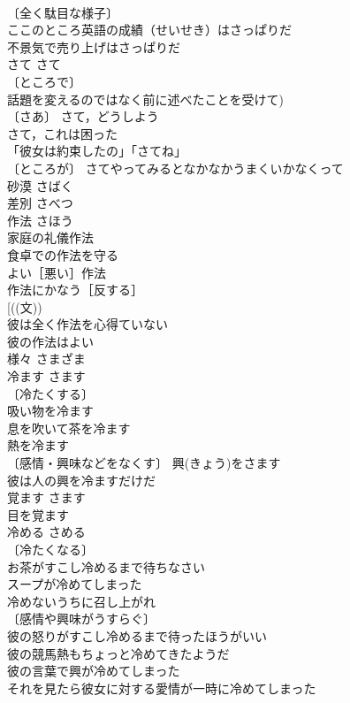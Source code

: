 \documentclass[8pt]{extreport}
\begin{document}
\begin{CJK}{UTF8}{min}
\\	〔全く駄目な様子〕 
\\	ここのところ英語の成績（せいせき）はさっぱりだ 
\\	不景気で売り上げはさっぱりだ 
\\	さて	さて	
\\	〔ところで〕
\\	話題を変えるのではなく前に述べたことを受けて) 
\\	〔さあ〕 さて，どうしよう 
\\	さて，これは困った 
\\	「彼女は約束したの」「さてね」 
\\	〔ところが〕 さてやってみるとなかなかうまくいかなくって 
\\	砂漠	さばく	
\\	差別	さべつ	
\\	作法	さほう	
\\	家庭の礼儀作法 
\\	食卓での作法を守る 
\\	よい［悪い］作法 
\\	作法にかなう［反する］ 
\\	[((文))
\\	彼は全く作法を心得ていない 
\\	彼の作法はよい 
\\	様々	さまざま	
\\	冷ます	さます	
\\	〔冷たくする〕
\\	吸い物を冷ます 
\\	息を吹いて茶を冷ます 
\\	熱を冷ます 
\\	〔感情・興味などをなくす〕 興(きょう)をさます 
\\	彼は人の興を冷ますだけだ 
\\	覚ます	さます	
\\	目を覚ます　
\\	冷める	さめる	
\\	〔冷たくなる〕
\\	お茶がすこし冷めるまで待ちなさい 
\\	スープが冷めてしまった 
\\	冷めないうちに召し上がれ 
\\	〔感情や興味がうすらぐ〕
\\	彼の怒りがすこし冷めるまで待ったほうがいい 
\\	彼の競馬熱もちょっと冷めてきたようだ 
\\	彼の言葉で興が冷めてしまった 
\\	それを見たら彼女に対する愛情が一時に冷めてしまった 

\end{CJK}
\end{document}
